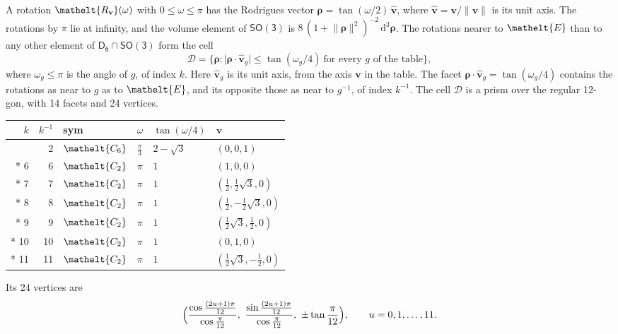 \documentclass[10pt,a4paper]{article}
\numberwithin{equation}{section}
\newcommand{\eltfont}[1]{{\let\sigma\eltsigma\mathelt{#1}}}
\newcommand{\grp}[1]{\mathsf{#1}}
\newcommand{\cls}[1]{\eltfont{#1}}
\newcommand{\elt}[1]{\eltfont{#1}}
\newcommand{\dirvec}[3]{(#1, #2, #3)}
\newcommand{\unitaxis}{\hat{\mathbf{v}}}
\newcommand{\vv}{\mathbf{v}}
\newcommand{\diff}{\mathrm{d}}
\newcommand{\rodrigues}{\boldsymbol{\rho}}
\newcommand{\fcell}{\mathcal{D}}
\begin{document}
\leavevmode\label{n:vector.rodrigues}\label{n:vector.unitaxis}A rotation $\elt{R_{\vv}}(\omega)$ with $0 \le \omega \le \pi$ has the Rodrigues vector $\rodrigues = \tan(\omega/2)\,\unitaxis$, where $\unitaxis = \vv/\lVert\vv\rVert$ is its unit axis. The rotations by $\pi$ lie at infinity, and the volume element of \href{SO3.pdf}{$\grp{SO(3)}$} is $8\,(1 + \lVert\rodrigues\rVert^2)^{-2}\,\diff^3\rodrigues$.
\leavevmode\label{n:set.cell}The rotations nearer to $\elt{E}$ than to any other element of $\grp{D_{6}} \cap \grp{SO(3)}$ form the cell
\begin{equation}\label{e:cell}\fcell = \bigl\{\rodrigues : \lvert\rodrigues\cdot\unitaxis_g\rvert \le \tan(\omega_g/4)\ \text{for every $g$ of the table}\bigr\},\end{equation}
where $\omega_g \le \pi$ is the angle of $g$, of index $k$. Here $\unitaxis_g$ is its unit axis, from the axis $\vv$ in the table. The facet $\rodrigues\cdot\unitaxis_g = \tan(\omega_g/4)$ contains the rotations as near to $g$ as to $\elt{E}$, and its opposite those as near to $g^{-1}$, of index $k^{-1}$. The cell $\fcell$ is a prism over the regular 12-gon, with 14 facets and 24 vertices.
{\small{\renewcommand{\arraystretch}{1.3}\begin{longtable}{@{}rrllll@{}}\toprule
$k$ & $k^{-1}$ & sym & $\omega$ & $\tan(\omega/4)$ & $\vv$\\\midrule\endhead
\bottomrule\endfoot\endlastfoot
1 & 2 & $\cls{C_{6}}$ & $\tfrac{\pi}{3}$ & $2 - \sqrt{3}$ & $\dirvec{0}{0}{1}$\\*
6 & 6 & $\cls{C_{2}}$ & $\pi$ & $1$ & $\dirvec{1}{0}{0}$\\*
7 & 7 & $\cls{C_{2}}$ & $\pi$ & $1$ & $\dirvec{\tfrac{1}{2}}{\tfrac{1}{2}\sqrt{3}}{0}$\\*
8 & 8 & $\cls{C_{2}}$ & $\pi$ & $1$ & $\dirvec{\tfrac{1}{2}}{-\tfrac{1}{2}\sqrt{3}}{0}$\\*
9 & 9 & $\cls{C_{2}}$ & $\pi$ & $1$ & $\dirvec{\tfrac{1}{2}\sqrt{3}}{\tfrac{1}{2}}{0}$\\*
10 & 10 & $\cls{C_{2}}$ & $\pi$ & $1$ & $\dirvec{0}{1}{0}$\\*
11 & 11 & $\cls{C_{2}}$ & $\pi$ & $1$ & $\dirvec{\tfrac{1}{2}\sqrt{3}}{-\tfrac{1}{2}}{0}$\\
\bottomrule\end{longtable}}}
\leavevmode\label{n:local.vertex.u}Its 24 vertices are
\begin{equation}\label{e:prism}\Bigl(\frac{\cos\frac{(2u+1)\pi}{12}}{\cos\frac{\pi}{12}},\ \frac{\sin\frac{(2u+1)\pi}{12}}{\cos\frac{\pi}{12}},\ \pm\tan\frac{\pi}{12}\Bigr),\qquad u = 0, 1, \dots, 11.\end{equation}
\end{document}
